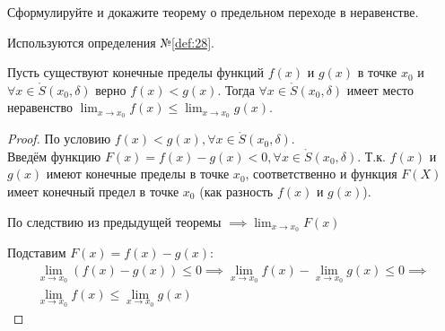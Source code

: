 \begin{question}
    Сформулируйте и докажите теорему о предельном переходе в неравенстве.
\end{question}
\begin{used}
    Используются определения №\ref{def:28}.
\end{used}
\begin{theorem}
    Пусть существуют конечные пределы функций $f(x)$ и  $g(x)$ в точке $x_0$ и $\forall x \in \mathring{S}(x_0, \delta)$ верно $f(x) < g(x)$. Тогда $\forall x \in \mathring{S}(x_0, \delta)$ имеет место неравенство $\lim_{x \to x_0} f(x) \le \lim_{x \to x_0} g(x)$.
\end{theorem}
\begin{proof}
    По условию $f(x) < g(x), \forall x \in \mathring{S}(x_0, \delta)$. \\
    Введём функцию $F(x) = f(x) - g(x) < 0, \forall x \in \mathring{S}(x_0, \delta)$. 
    Т.к. $f(x)$ и $g(x)$ имеют конечные пределы в точке $x_0$, соответственно и функция $F(X)$ имеет конечный предел в точке $x_0$ (как разность $f(x)$ и $g(x)$).
  
    По следствию из предыдущей теоремы
    $\implies \lim_{x \to x_0} F(x) $ 
  
    Подставим $F(x) = f(x) - g(x)$:
    \begin{gather*}
        \lim_{x \to x_0} \left( f(x) - g(x) \right) \le 0 \implies \lim_{x \to x_0} f(x) - \lim_{x \to x_0} g(x) \le 0 \implies \\
        \lim_{x \to x_0} f(x) \le \lim_{x \to x_0} g(x) 
    \end{gather*}
\end{proof}
\pagebreak



